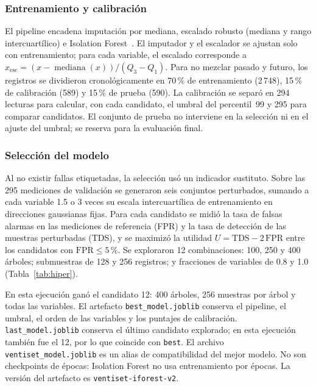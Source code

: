 \documentclass[10pt,twocolumn]{article}
\newcommand{\code}[1]{\texttt{\small #1}}
\begin{document}
\subsubsection{Entrenamiento y calibración}
El pipeline encadena imputación por mediana, escalado robusto (mediana y rango intercuartílico) e
Isolation Forest~\cite{sklearn}. El imputador y el escalador se ajustan solo con entrenamiento;
para cada variable, el escalado corresponde a
\(x_{\mathrm{esc}}=(x-\operatorname{mediana}(x))/(Q_3-Q_1)\). Para no mezclar pasado y futuro,
los registros se dividieron cronológicamente en 70\,\% de entrenamiento (2\,748), 15\,\% de
calibración (589) y 15\,\% de prueba (590). La calibración se separó en 294 lecturas para
calcular, con cada candidato, el umbral del percentil~99 y 295 para comparar candidatos. El
conjunto de prueba no interviene en la selección ni en el ajuste del umbral; se reserva para la
evaluación final.

\subsubsection{Selección del modelo}
Al no existir fallas etiquetadas, la selección usó un indicador sustituto. Sobre las 295
mediciones de validación se generaron seis conjuntos perturbados, sumando a cada variable 1.5 o 3
veces su escala intercuartílica de entrenamiento en direcciones gaussianas fijas. Para cada
candidato se midió la tasa de falsas alarmas en las mediciones de referencia (FPR) y la tasa de
detección de las muestras perturbadas (TDS), y se maximizó la utilidad
$U=\mathrm{TDS}-2\,\mathrm{FPR}$ entre los candidatos con
$\mathrm{FPR}\leq5$\,\%. Se exploraron 12 combinaciones: 100, 250 y 400 árboles; submuestras de
128 y 256 registros; y fracciones de variables de 0.8 y 1.0 (Tabla~\ref{tab:hiper}).

En esta ejecución ganó el candidato 12: 400 árboles, 256 muestras por árbol y todas las variables.
El artefacto \code{best\_model.joblib} conserva el pipeline, el umbral, el orden de las variables
y los puntajes de calibración. \code{last\_model.joblib} conserva el último candidato explorado;
en esta ejecución también fue el 12, por lo que coincide con \code{best}. El archivo
\code{ventiset\_model.joblib} es un alias de compatibilidad del mejor modelo. No son checkpoints
de épocas: Isolation Forest no usa entrenamiento por épocas. La versión del artefacto es
\code{ventiset-iforest-v2}.
\end{document}
